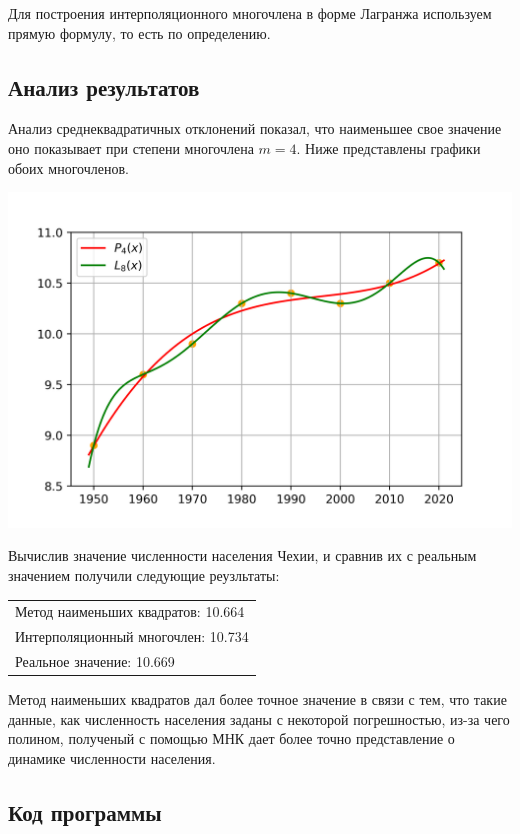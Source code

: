 Для построения интерполяционного многочлена в форме Лагранжа используем прямую формулу, то есть по определению.

\subsection*{Анализ результатов}

Анализ среднеквадратичных отклонений показал, что наименьшее свое значение оно показывает при степени многочлена $m = 4$. Ниже представлены графики обоих многочленов.

\noindent
\includegraphics{plot_4.1.png}

Вычислив значение численности населения Чехии, и сравнив их с реальным значением получили следующие реузльтаты:

\begin{tabular}{l}
	Метод наименьших квадратов: 10.664 \\
	Интерполяционный многочлен: 10.734 \\
	Реальное значение: 10.669 \\
\end{tabular}

Метод наименьших квадратов дал более точное значение в связи с тем, что такие данные, как численность населения заданы с некоторой погрешностью, из-за чего полином, полученый с помощью МНК дает более точно представление о динамике численности населения.
\newpage
\subsection*{Код программы}


